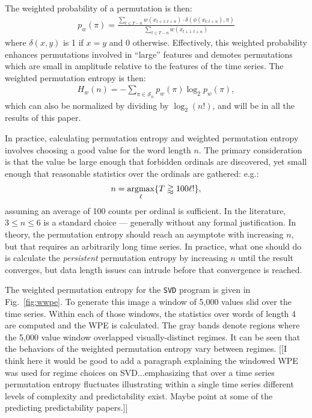\documentclass{article}
\begin{document}
The weighted probability of a permutation is then:
\begin{align*}
  p_w(\pi) = \frac{\displaystyle \sum_{t \le T - n} w(x_{t+1:t+n}) \cdot \delta(\phi(x_{t:t+n}), \pi) }{\displaystyle \sum_{t \le T - n} w(x_{t+1:t+n})}
\end{align*}
where $\delta(x, y)$ is 1 if $x = y$ and 0 otherwise. Effectively, this weighted
probability enhances permutations involved in ``large'' features and demotes
permutations which are small in amplitude relative to the features of the time
series. The weighted permutation entropy is then:
\begin{align*}
  H_w(n) = - \sum_{\pi \in \mathcal{S}_n} p_w(\pi) \log_2 p_w(\pi),
\end{align*}
which can also be normalized by dividing by $\log_2(n!)$, and will be in all the
results of this paper.

In practice, calculating permutation entropy and weighted permutation entropy
involves choosing a good value for the word length $n$. The primary
consideration is that the value be large enough that forbidden ordinals are
discovered, yet small enough that reasonable statistics over the ordinals are
gathered: e.g.:
\begin{align*}
  n = \operatornamewithlimits{argmax}_\ell \{ T \gtrapprox 100 \ell! \},
\end{align*}
assuming an average of 100 counts per ordinal is sufficient. In the literature,
$3 \le n \le 6$ is a standard choice --- generally without any formal
justification. In theory, the permutation entropy should reach an asymptote with
increasing $n$, but that requires an arbitrarily long time series. In practice,
what one should do is calculate the \emph{persistent} permutation entropy by
increasing $n$ until the result converges, but data length issues can intrude
before that convergence is reached.

The weighted permutation entropy for the {\tt SVD} program is given in
Fig.~\ref{fig:wwpe}. To generate this image a window of 5,000 values slid over
the time series. Within each of those windows, the statistics over words of
length 4 are computed and the WPE is calculated. The gray bands denote regions
where the 5,000 value window overlapped visually-distinct regimes. It can be
seen that the behaviors of the weighted permutation entropy vary between
regimes. [[I think here it would be good to add a paragraph explaining the windowed WPE was used for regime choices on SVD...emphasizing  that over a time series permutation entropy fluctuates illustrating within a single time series different levels of complexity and predictability exist. Maybe point at some of the predicting predictability papers.]]
\end{document}
